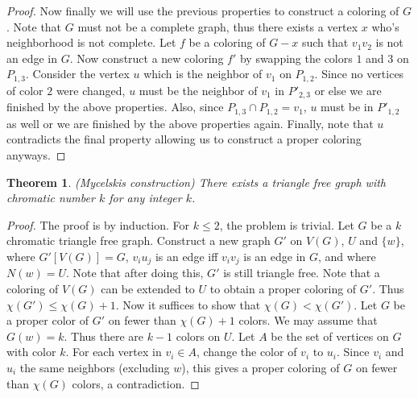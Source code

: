 \documentclass[12pt]{article}
\newtheorem{theorem}{Theorem}
\begin{document}
\begin{proof}
  Now finally we will use the previous properties to construct a
  coloring of $G$. Note that $G$ must not be a complete graph, thus
  there exists a vertex $x$ who's neighborhood is not complete. Let
  $f$ be a coloring of $G-x$ such that $v_1v_2$ is not an edge in
  $G$. Now construct a new coloring $f'$ by swapping the colors $1$
  and $3$ on $P_{1,3}$. Consider the vertex $u$ which is the neighbor
  of $v_1$ on $P_{1,2}$. Since no vertices of color $2$ were changed,
  $u$ must be the neighbor of $v_1$ in $P'_{2, 3}$ or else we are
  finished by the above properties. Also, since
  $P_{1,3} \cap P_{1,2} = v_1$, $u$ must be in $P'_{1,2}$ as well or
  we are finished by the above properties again.  Finally, note that
  $u$ contradicts the final property allowing us to construct a proper
  coloring anyways.
\end{proof}

\begin{theorem} (Mycelskis construction) There exists a triangle free
  graph with chromatic number $k$ for any integer $k$.
\end{theorem}
\begin{proof} The proof is by induction. For $k \leq 2$, the problem
  is trivial.  Let $G$ be a $k$ chromatic triangle free
  graph. Construct a new graph $G'$ on $V(G)$, $U$ and $\{w\}$, where
  $G'[V(G)] = G$, $v_i u_j$ is an edge iff $v_i v_j$ is an edge in
  $G$, and where $N(w) = U$. Note that after doing this, $G'$ is still
  triangle free. Note that a coloring of $V(G)$ can be extended to $U$
  to obtain a proper coloring of $G'$. Thus
  $\chi(G') \leq \chi(G) + 1$. Now it suffices to show that
  $\chi(G) < \chi(G')$. Let $G$ be a proper color of $G'$ on fewer
  than $\chi(G) + 1$ colors. We may assume that $G(w) = k$. Thus there
  are $k-1$ colors on $U$. Let $A$ be the set of vertices on $G$ with
  color $k$. For each vertex in $v_i \in A$, change the color of $v_i$
  to $u_i$. Since $v_i$ and $u_i$ the same neighbors (excluding $w$),
  this gives a proper coloring of $G$ on fewer than $\chi(G)$ colors,
  a contradiction.
\end{proof}
\end{document}
